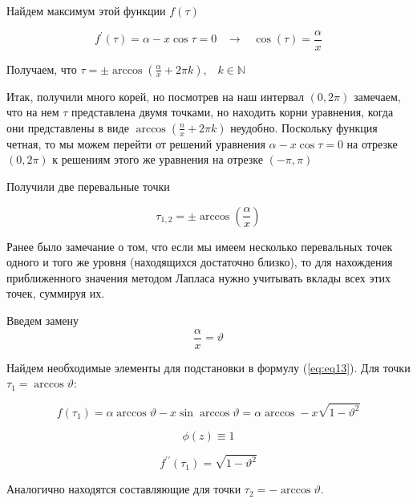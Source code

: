 \documentclass[14pt]{extarticle}
\begin{document}
Найдем максимум этой функции $f(\tau)$

\begin{equation}\label{eq:eq15}
f^\prime(\tau) = \alpha - x \cos \tau = 0 \;\;\; \rightarrow \;\;\; \cos(\tau)=\frac{\alpha}{x}
\end{equation} 

Получаем, что $\tau = \pm \arccos\left(\frac{\alpha}{x} + 2\pi k \right), \;\;\; k \in \mathbb{N}$

Итак, получили много корей, но посмотрев на наш интервал $(0, 2\pi)$ замечаем, что на нем $\tau$ представлена двумя точками, но находить корни уравнения, когда они представлены в виде $\arccos\left(\frac{n}{x} + 2\pi k \right)$ неудобно. Поскольку функция четная, то мы можем перейти от решений уравнения $\alpha - x \cos \tau = 0$ на отрезке $(0, 2\pi)$ к решениям этого же уравнения на отрезке $(-\pi, \pi)$

Получили две перевальные точки

\begin{equation}\nonumber
\tau_{1,2} = \pm \arccos\left(\frac{\alpha}{x}\right)
\end{equation} 

Ранее было замечание о том, что если мы имеем несколько перевальных точек одного и того же уровня (находящихся достаточно близко), то для нахождения приближенного значения методом Лапласа нужно учитывать вклады всех этих точек, суммируя их.

Введем замену 
\begin{equation}\nonumber
\frac{\alpha}{x} = \vartheta
\end{equation}

Найдем необходимые элементы для подстановки в формулу (\ref{eq:eq13}). Для точки $\tau_1 = \arccos\vartheta$:

\begin{equation}\nonumber
f(\tau_1) = \alpha \arccos\vartheta - x \sin \arccos\vartheta = \alpha \arccos - x \sqrt{1-\vartheta^2}
\end{equation}

\begin{equation}\nonumber
\phi(z) \equiv 1
\end{equation}

\begin{equation}\nonumber
f^{\prime \prime} (\tau_1) = \sqrt{1-\vartheta^2}
\end{equation}

Аналогично находятся составляющие для точки $\tau_2 = -\arccos\vartheta$.
\end{document}
